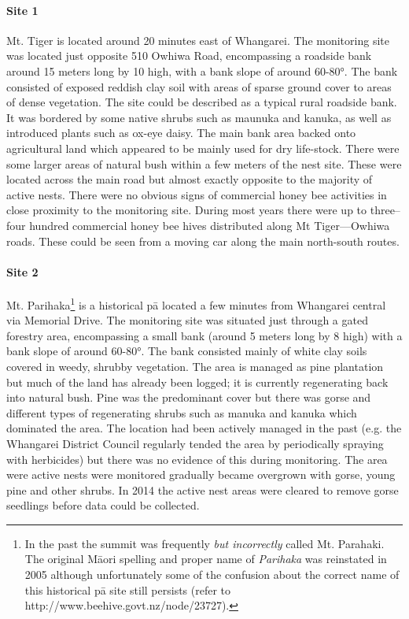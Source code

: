 \paragraph{Site 1} Mt. Tiger is located around 20 minutes east of Whangarei. The monitoring site was located just opposite 510 Owhiwa Road, encompassing a roadside bank around 15 meters long by 10 high, with a bank slope of around 60-80°. The bank consisted of exposed reddish clay soil with areas of sparse ground cover to areas of dense vegetation. The site could be described as a typical rural roadside bank. It was bordered by some native shrubs such as maunuka and kanuka, as well as introduced plants such as ox-eye daisy. The main bank area backed onto agricultural land which appeared to be mainly used for dry life-stock. There were some larger areas of natural bush within a few meters of the nest site. These were located across the main road but almost exactly opposite to the majority of active nests. There were no obvious signs of commercial honey bee activities in close proximity to the monitoring site. During most years there were up to three--four hundred commercial honey bee hives distributed along Mt Tiger---Owhiwa roads. These could be seen from a moving car along the main north-south routes.

\paragraph{Site 2} Mt. Parihaka\footnote{In the past the summit was frequently \emph{but incorrectly} called Mt. Parahaki. The original M\={a}ori spelling and proper name of \emph{Parihaka} was reinstated in 2005 although unfortunately some of the confusion about the correct name of this historical p\={a} site still persists (refer to http://www.beehive.govt.nz/node/23727).} is a historical p\={a} located a few minutes from Whangarei central via Memorial Drive. The monitoring site was situated just through a gated forestry area, encompassing a small bank (around 5 meters long by 8 high) with a bank slope of around 60-80°. The bank consisted mainly of white clay soils covered in weedy, shrubby vegetation. The area is managed as pine plantation but much of the land has already been logged; it is currently regenerating back into natural bush. Pine was the predominant cover but there was gorse and different types of regenerating shrubs such as manuka and kanuka which dominated the area. The  location had been actively managed in the past (e.g. the Whangarei District Council regularly tended the area by periodically spraying with herbicides) but there was no evidence of this during monitoring. The area were active nests were monitored gradually became overgrown with gorse, young pine and other shrubs. In 2014 the active nest areas were cleared to remove gorse seedlings before data could be collected.


